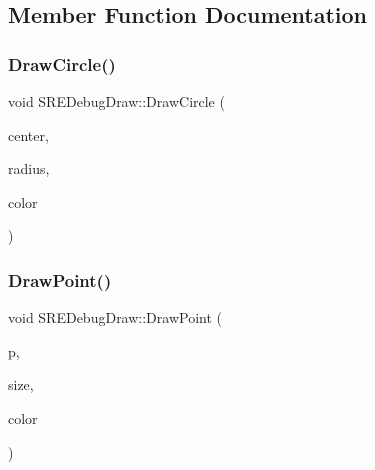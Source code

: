 \subsection{Member Function Documentation}
\hypertarget{class_mason_1_1_s_r_e_debug_draw_a6cb71e10d252900e6f469389146b9f48}{}\label{class_mason_1_1_s_r_e_debug_draw_a6cb71e10d252900e6f469389146b9f48} 
\subsubsection{\texorpdfstring{Draw\+Circle()}{DrawCircle()}}
{\footnotesize\ttfamily void S\+R\+E\+Debug\+Draw\+::\+Draw\+Circle (\begin{DoxyParamCaption}\item[{const b2\+Vec2 \&}]{center,  }\item[{float32}]{radius,  }\item[{const b2\+Color \&}]{color }\end{DoxyParamCaption})}

\hypertarget{class_mason_1_1_s_r_e_debug_draw_aaa826d0f196accca390c47023d28e2ce}{}\label{class_mason_1_1_s_r_e_debug_draw_aaa826d0f196accca390c47023d28e2ce} 
\subsubsection{\texorpdfstring{Draw\+Point()}{DrawPoint()}}
{\footnotesize\ttfamily void S\+R\+E\+Debug\+Draw\+::\+Draw\+Point (\begin{DoxyParamCaption}\item[{const b2\+Vec2 \&}]{p,  }\item[{float32}]{size,  }\item[{const b2\+Color \&}]{color }\end{DoxyParamCaption})}

\hypertarget{class_mason_1_1_s_r_e_debug_draw_a3aeb14dc08bb5c4d490e30cc62ad1787}{}\label{class_mason_1_1_s_r_e_debug_draw_a3aeb14dc08bb5c4d490e30cc62ad1787} 

